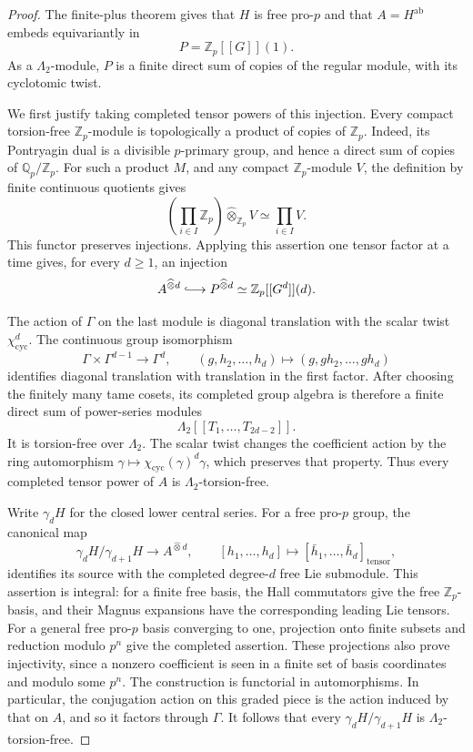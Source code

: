 \documentclass[11pt]{article}
\theoremstyle{definition}\newtheorem{definition}[theorem]{Definition}
\begin{document}
\begin{proof}
The finite-plus theorem gives that \(H\) is free pro-\(p\) and
that \(A=H^{\mathrm{ab}}\) embeds equivariantly in
\[
 P=\mathbb Z_p[[G]](1).
\]
As a \(\Lambda_2\)-module, \(P\) is a finite direct sum of
copies of the regular module, with its cyclotomic twist.

We first justify taking completed tensor powers of this
injection.  Every compact torsion-free \(\mathbb Z_p\)-module
is topologically a product of copies of \(\mathbb Z_p\).
Indeed, its Pontryagin dual is a divisible \(p\)-primary group,
and hence a direct sum of copies of
\(\mathbb Q_p/\mathbb Z_p\).  For such a product \(M\), and any
compact \(\mathbb Z_p\)-module \(V\), the definition by finite
continuous quotients gives
\[
 \left(\prod_{i\in I}\mathbb Z_p\right)
       \widehat\otimes_{\mathbb Z_p}V
             \simeq\prod_{i\in I}V.
\]
This functor preserves injections.  Applying this assertion
one tensor factor at a time gives, for every \(d\geq1\), an
injection
\[
 A^{\widehat\otimes d}\lhook\joinrel\longrightarrow
 P^{\widehat\otimes d}
     \simeq\mathbb Z_p[[G^d]](d).
\]

The action of \(\Gamma\) on the last module is diagonal
translation with the scalar twist
\(\chi_{\mathrm{cyc}}^d\).  The continuous group isomorphism
\[
 \Gamma\times\Gamma^{d-1}\longrightarrow\Gamma^d,\qquad
 (g,h_2,\ldots,h_d)\longmapsto
                (g,gh_2,\ldots,gh_d)
\]
identifies diagonal translation with translation in the first
factor.  After choosing the finitely many tame cosets, its
completed group algebra is therefore a finite direct sum of
power-series modules
\[
             \Lambda_2[[T_1,\ldots,T_{2d-2}]].
\]
It is torsion-free over \(\Lambda_2\).  The scalar twist changes
the coefficient action by the ring automorphism
\(\gamma\mapsto\chi_{\mathrm{cyc}}(\gamma)^d\gamma\), which
preserves that property.  Thus every completed tensor power
of \(A\) is \(\Lambda_2\)-torsion-free.

Write \(\gamma_dH\) for the closed lower central series.
For a free pro-\(p\) group, the canonical map
\[
 \gamma_dH/\gamma_{d+1}H
        \longrightarrow A^{\widehat\otimes d},
 \qquad
 [h_1,\ldots,h_d]\longmapsto
          [\bar h_1,\ldots,\bar h_d]_{\mathrm{tensor}},
\]
identifies its source with the completed degree-\(d\) free
Lie submodule.  This assertion is integral: for a finite free
basis, the Hall commutators give the free
\(\mathbb Z_p\)-basis, and their Magnus expansions have the
corresponding leading Lie tensors.  For a general free
pro-\(p\) basis converging to one, projection onto finite
subsets and reduction modulo \(p^n\) give the completed
assertion.  These projections also prove injectivity, since a
nonzero coefficient is seen in a finite set of basis
coordinates and modulo some \(p^n\).  The construction is
functorial in automorphisms.  In particular, the conjugation
action on this graded piece is the action induced by that on
\(A\), and so it factors through \(\Gamma\).
It follows that every
\(\gamma_dH/\gamma_{d+1}H\) is
\(\Lambda_2\)-torsion-free.


\end{proof}
\end{document}
